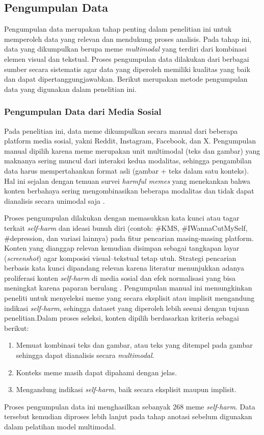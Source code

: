 \subsection{Pengumpulan Data} \label{subsec:pengumpulan_data}
Pengumpulan data merupakan tahap penting dalam penelitian ini untuk memperoleh data yang relevan dan mendukung proses analisis. Pada tahap ini, data yang dikumpulkan berupa meme \textit{multimodal} yang terdiri dari kombinasi elemen visual dan tekstual. Proses pengumpulan data dilakukan dari berbagai sumber secara sistematis agar data yang diperoleh memiliki kualitas yang baik dan dapat dipertanggungjawabkan. Berikut merupakan metode pengumpulan data yang digunakan dalam penelitian ini.

\subsubsection{Pengumpulan Data dari Media Sosial} \label{subsubsec:pengumpulan_data_media_sosial}
Pada penelitian ini, data meme dikumpulkan secara manual dari beberapa platform media sosial, yakni Reddit, Instagram, Facebook, dan X. Pengumpulan manual dipilih karena meme merupakan unit multimodal (teks dan gambar) yang maknanya sering muncul dari interaksi kedua modalitas, sehingga pengambilan data harus mempertahankan format asli (gambar + teks dalam satu konteks). Hal ini sejalan dengan temuan survei \textit{harmful memes} yang menekankan bahwa konten berbahaya sering mengombinasikan beberapa modalitas dan tidak dapat dianalisis secara unimodal saja \cite{Sharma2022HarmfulMemes}.

Proses pengumpulan dilakukan dengan memasukkan kata kunci atau tagar terkait \textit{self-harm} dan ideasi bunuh diri (contoh: \#KMS, \#IWannaCutMySelf, \#depression, dan variasi lainnya) pada fitur pencarian masing-masing platform. Konten yang dianggap relevan kemudian disimpan sebagai tangkapan layar (\textit{screenshot}) agar komposisi visual--tekstual tetap utuh. Strategi pencarian berbasis kata kunci dipandang relevan karena literatur menunjukkan adanya proliferasi konten \textit{self-harm} di media sosial dan efek normalisasi yang bisa meningkat karena paparan berulang \cite{MoraledaEsteban2025SelfHarm}. Pengumpulan manual ini memungkinkan peneliti untuk menyeleksi meme yang secara eksplisit atau implisit mengandung indikasi \textit{self-harm}, sehingga dataset yang diperoleh lebih sesuai dengan tujuan penelitian.Dalam proses seleksi, konten dipilih berdasarkan kriteria sebagai berikut:
\begin{enumerate}
    \item Memuat kombinasi teks dan gambar, atau teks yang ditempel pada gambar sehingga dapat dianalisis secara \textit{multimodal}.
    \item Konteks meme masih dapat dipahami dengan jelas.
    \item Mengandung indikasi \textit{self-harm}, baik secara eksplisit maupun implisit.
\end{enumerate}
Proses pengumpulan data ini menghasilkan sebanyak 268 meme \textit{self-harm}. Data tersebut kemudian diproses lebih lanjut pada tahap anotasi sebelum digunakan dalam pelatihan model multimodal.

